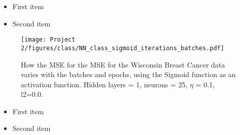 \documentclass[english,notitlepage,reprint,nofootinbib]{revtex4-2}  %
\begin{document}
\begin{itemize}
\color{white}
\item First item
\item Second item
\end{itemize}

\begin{figure}[h!]
    \centering %
    \texttt{[image: Project 2/figures/class/NN\_class\_sigmoid\_iterations\_batches.pdf]} 
    \caption{How the MSE for the MSE for the Wisconsin Breast Cancer data varies with the batches and epochs, using the Sigmoid function as an activation function. Hidden layers = 1, neurons = 25, $\eta$ = 0.1, l2=0.0. 
    }
    \label{fig: nn_iter_batch}
\end{figure}


\begin{itemize}
\color{white}
\item First item
\item Second item
\end{itemize}



\onecolumngrid
%
\end{document}
